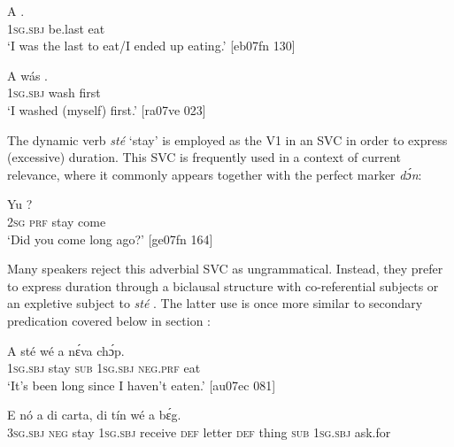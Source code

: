\ea%
    \label{ex:key:1580}
    \gll \MakeUppercase{A}       .\\
\textsc{1sg.sbj}  be.last  eat\\

\glt ‘I was the last to eat/I ended up eating.’ [eb07fn 130]
\z


\z


\ea%
    \label{ex:key:1582}
    \gll A    wás    .\\
\textsc{1sg.sbj}  wash  first\\

\glt ‘I washed (myself) first.’ [ra07ve 023]
\z

The dynamic verb \textit{sté} ‘stay’ is employed as the V1 in an SVC in order to express (excessive) duration. This SVC is frequently used in a context of current relevance, where it commonly appears together with the perfect marker \textit{dɔ́n}: 


\ea%
    \label{ex:key:1583}
    \gll Yu      ?\\
\textsc{2sg}  \textsc{prf}  stay  come\\

\glt ‘Did you come long ago?’ [ge07fn 164]
\z

Many speakers reject this adverbial SVC as ungrammatical. Instead, they prefer to express duration through a biclausal structure with co-referential subjects  or an expletive subject to \textit{sté} . The latter use is once more similar to secondary predication covered below in section :


\ea%
    \label{ex:key:1584}
    \gll A    sté  wé  a    nɛ́va  chɔ́p.\\
\textsc{1sg.sbj}  stay  \textsc{sub}  \textsc{1sg.sbj}  \textsc{neg}.\textsc{prf}  eat\\

\glt ‘It’s been long since I haven’t eaten.’ [au07ec 081]
\z


\ea%
    \label{ex:key:1585}
    \gll E    nó    a      di  carta,
di  tín    wé  a    bɛ́g.\\
\textsc{3sg.sbj}  \textsc{neg}  stay    \textsc{1sg.sbj}  receive  \textsc{def}   letter
\textsc{def}  thing  \textsc{sub}  \textsc{1sg.sbj}  ask.for\\

